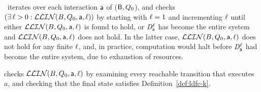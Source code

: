 

%
\ iterates over each interaction $\mathsf{a}$ of ($\mathsf{B}, Q_0$), and checks 
$(\exists\, \ell > 0: \mathcal{LLIN}(B, Q_0, \mathsf{a}, \ell))$ by starting with $\ell=1$ and incrementing $\ell$ until
either $\mathcal{LLIN}(B, Q_0, \mathsf{a}, \ell)$ is found to hold, or 
$\mathit{D}_{\mathsf{a}}^{\ell}$ has become the entire system and $\mathcal{LLIN}(B, Q_0, \mathsf{a}, \ell)$ does not hold. In the latter case, 
$\mathcal{LLIN}(B, Q_0, \mathsf{a}, \ell)$ does not hold for any finite $\ell$, and, in practice, 
computation would halt 
before $\mathit{D}_{\mathsf{a}}^{\ell}$ had become the entire system, due to exhaustion of resources.

 checks $\mathcal{LLIN}(B, Q_0, \mathsf{a}, \ell)$ by examining every reachable transition
that executes $a$, and checking that the final state satisfies
Definition~\ref{def:ldfc-k}. 

